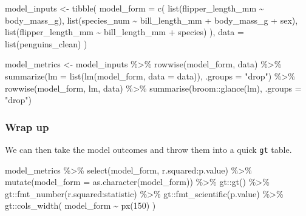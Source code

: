 \documentclass[
]{article}
\newenvironment{Shaded}{\begin{snugshade}}{\end{snugshade}}
\newcommand{\AttributeTok}[1]{\textcolor[rgb]{0.77,0.63,0.00}{#1}}
\newcommand{\DecValTok}[1]{\textcolor[rgb]{0.00,0.00,0.81}{#1}}
\newcommand{\FunctionTok}[1]{\textcolor[rgb]{0.00,0.00,0.00}{#1}}
\newcommand{\NormalTok}[1]{#1}
\newcommand{\OtherTok}[1]{\textcolor[rgb]{0.56,0.35,0.01}{#1}}
\newcommand{\SpecialCharTok}[1]{\textcolor[rgb]{0.00,0.00,0.00}{#1}}
\newcommand{\StringTok}[1]{\textcolor[rgb]{0.31,0.60,0.02}{#1}}
\begin{document}
\begin{Shaded}
\begin{Highlighting}[]
\NormalTok{model\_inputs }\OtherTok{\textless{}{-}} \FunctionTok{tibble}\NormalTok{(}
  \AttributeTok{model\_form =} \FunctionTok{c}\NormalTok{(}
    \FunctionTok{list}\NormalTok{(flipper\_length\_mm }\SpecialCharTok{\textasciitilde{}}\NormalTok{ body\_mass\_g),}
    \FunctionTok{list}\NormalTok{(species\_num }\SpecialCharTok{\textasciitilde{}}\NormalTok{ bill\_length\_mm }\SpecialCharTok{+}\NormalTok{ body\_mass\_g }\SpecialCharTok{+}\NormalTok{ sex),}
    \FunctionTok{list}\NormalTok{(flipper\_length\_mm }\SpecialCharTok{\textasciitilde{}}\NormalTok{ bill\_length\_mm }\SpecialCharTok{+}\NormalTok{ species)}
\NormalTok{    ),}
  \AttributeTok{data =} \FunctionTok{list}\NormalTok{(penguins\_clean)}
\NormalTok{) }

\NormalTok{model\_metrics }\OtherTok{\textless{}{-}}\NormalTok{ model\_inputs }\SpecialCharTok{\%\textgreater{}\%} 
  \FunctionTok{rowwise}\NormalTok{(model\_form, data) }\SpecialCharTok{\%\textgreater{}\%} 
  \FunctionTok{summarize}\NormalTok{(}\AttributeTok{lm =} \FunctionTok{list}\NormalTok{(}\FunctionTok{lm}\NormalTok{(model\_form, }\AttributeTok{data =}\NormalTok{ data)), }\AttributeTok{.groups =} \StringTok{"drop"}\NormalTok{) }\SpecialCharTok{\%\textgreater{}\%} 
  \FunctionTok{rowwise}\NormalTok{(model\_form, lm, data) }\SpecialCharTok{\%\textgreater{}\%} 
  \FunctionTok{summarise}\NormalTok{(broom}\SpecialCharTok{::}\FunctionTok{glance}\NormalTok{(lm), }\AttributeTok{.groups =} \StringTok{"drop"}\NormalTok{)}
\end{Highlighting}
\end{Shaded}

\hypertarget{wrap-up}{%
\subsubsection{Wrap up}\label{wrap-up}}

We can then take the model outcomes and throw them into a quick
\texttt{gt} table.

\begin{Shaded}
\begin{Highlighting}[]
\NormalTok{model\_metrics }\SpecialCharTok{\%\textgreater{}\%} 
  \FunctionTok{select}\NormalTok{(model\_form, r.squared}\SpecialCharTok{:}\NormalTok{p.value) }\SpecialCharTok{\%\textgreater{}\%} 
  \FunctionTok{mutate}\NormalTok{(}\AttributeTok{model\_form =} \FunctionTok{as.character}\NormalTok{(model\_form)) }\SpecialCharTok{\%\textgreater{}\%} 
\NormalTok{  gt}\SpecialCharTok{::}\FunctionTok{gt}\NormalTok{() }\SpecialCharTok{\%\textgreater{}\%} 
\NormalTok{  gt}\SpecialCharTok{::}\FunctionTok{fmt\_number}\NormalTok{(r.squared}\SpecialCharTok{:}\NormalTok{statistic) }\SpecialCharTok{\%\textgreater{}\%} 
\NormalTok{  gt}\SpecialCharTok{::}\FunctionTok{fmt\_scientific}\NormalTok{(p.value) }\SpecialCharTok{\%\textgreater{}\%} 
\NormalTok{  gt}\SpecialCharTok{::}\FunctionTok{cols\_width}\NormalTok{(}
\NormalTok{    model\_form }\SpecialCharTok{\textasciitilde{}} \FunctionTok{px}\NormalTok{(}\DecValTok{150}\NormalTok{)}
\NormalTok{  )}
\end{Highlighting}
\end{Shaded}
\end{document}
